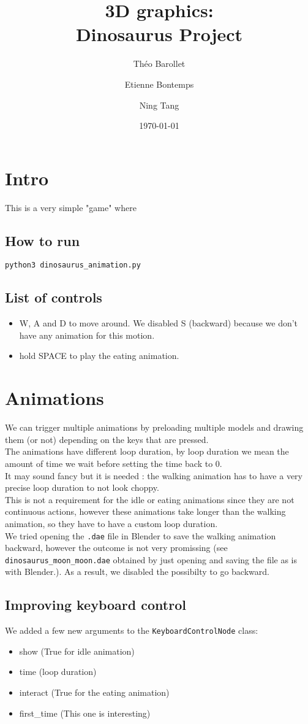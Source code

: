 \documentclass[11pt]{article}
\title{\textbf{3D graphics:}\\ Dinosaurus Project}
\date{\today}
\author{Théo Barollet \and Etienne Bontemps \and Ning Tang}
\begin{document}
\maketitle
\section{Intro}
\noindent This is a very simple "game" where
\subsection*{How to run}
    \texttt{python3 dinosaurus\_animation.py}

\subsection*{List of controls}
\begin{itemize}
    \item W, A and D to move around. We disabled S (backward) because we don't have any animation for this motion.
    \item hold SPACE to play the eating animation.
\end{itemize}

\section{Animations}
\noindent We can trigger multiple animations by preloading multiple models and drawing them (or not) depending on the keys that are pressed.\\
The animations have different loop duration, by loop duration we mean the amount of time we wait before setting the time back to 0.\\
It may sound fancy but it is needed : the walking animation has to have a very precise loop duration to not look choppy.\\
This is not a requirement for the idle or eating animations since they are not continuous actions, however these animations take longer than the walking animation, so they have to have a custom loop duration.\\
We tried opening the \texttt{.dae} file in Blender to save the walking animation backward, however the outcome is not very promissing (see \texttt{dinosaurus\_moon\_moon.dae} obtained by just opening and saving the file as is with Blender.). As a result, we disabled the possibilty to go backward.\\

\subsection*{Improving keyboard control}
\noindent We added a few new arguments to the \texttt{KeyboardControlNode} class:
\begin{itemize}
    \item show (True for idle animation)
    \item time (loop duration)
    \item interact (True for the eating animation)
    \item first\_time (This one is interesting)
\end{itemize}
\end{document}
